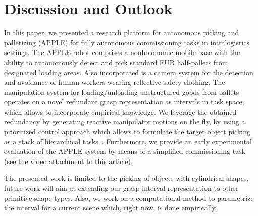 \section{Discussion and Outlook}
\label{sec:discussion}
%
In this paper, we presented a research platform for autonomous picking and palletizing (APPLE) for
fully autonomous commissioning tasks in intralogistics settings. The APPLE robot comprises a
nonholonomic mobile base with the ability to autonomously detect and pick standard EUR half-pallets
from designated loading areas. Also incorporated is a camera system for the detection and avoidance
of human workers wearing reflective safety clothing. The manipulation system for loading/unloading
unstructured goods from pallets operates on a novel redundant grasp representation as intervals in
task space, which allows to incorporate empirical knowledge. We leverage the obtained redundancy by
generating reactive manipulator motions on the fly, by using a prioritized control approach which
allows to formulate the target object picking as a stack of hierarchical
tasks~\cite{Kano11}. Furthermore, we provide an early experimental evaluation of the APPLE system by
means of a simplified commissioning task (see the video attachment to this article).

The presented work is limited to the picking of objects with cylindrical shapes, future work will
aim at extending our grasp interval representation to other primitive shape types. Also, we work on
a computational method to parametrize the interval for a current scene which, right now, is done
empirically. 


